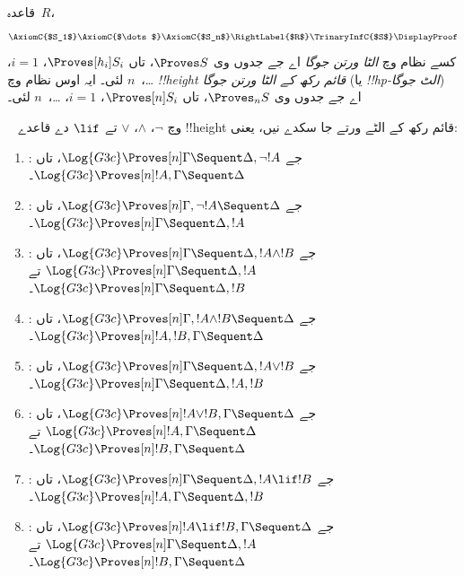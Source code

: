 \documentclass[../../../include/open-logic-section]{subfiles}
\begin{document}


\begin{defn}
قاعدہ~$R$،
\[
\AxiomC{$S_1$}
\AxiomC{$\dots$}
\AxiomC{$S_n$}
\RightLabel{$R$}
\TrinaryInfC{$S$}
\DisplayProof
\]
کسے نظام وچ \emph{الٹا ورتن جوگا} اے جے جدوں وی $\Proves S$، تاں $\Proves[h_i] S_i$، $i = 1$، \dots،~$n$ لئی۔ ایہ اوس نظام وچ \emph{!!{height} قائم رکھ کے الٹا ورتن جوگا} (یا \emph{!!{hp}-الٹ جوگا}) اے جے جدوں وی $\Proves_n S$، تاں $\Proves[n] S_i$، $i =
1$، \dots،~$n$ لئی۔
\end{defn}

\begin{lem}
~ وچ $\lnot$، $\land$، $\lor$ تے $\lif$ دے قاعدے !!{height} قائم رکھ کے الٹے ورتے جا سکدے نیں، یعنی:
\begin{enumerate}
  \item \RightR{\lnot}: جے $\Log{G3c} \Proves[n] \Gamma \Sequent
  \Delta, \lnot !A$، تاں $\Log{G3c} \Proves[n] !A, \Gamma \Sequent
  \Delta$۔
  \item \LeftR{\lnot}: جے $\Log{G3c} \Proves[n] \Gamma, \lnot !A
  \Sequent \Delta$، تاں $\Log{G3c} \Proves[n] \Gamma \Sequent \Delta,
  !A$۔
  \item \RightR{\land}: جے $\Log{G3c} \Proves[n] \Gamma \Sequent
  \Delta, !A \land !B$، تاں $\Log{G3c} \Proves[n] \Gamma \Sequent
  \Delta, !A$ تے $\Log{G3c} \Proves[n] \Gamma \Sequent
  \Delta, !B$۔
  \item \LeftR{\land}: جے $\Log{G3c} \Proves[n] \Gamma, !A \land !B
  \Sequent \Delta$، تاں $\Log{G3c} \Proves[n] !A, !B, \Gamma \Sequent
  \Delta$۔
  \item \RightR{\lor}: جے $\Log{G3c} \Proves[n] \Gamma \Sequent
  \Delta, !A \lor !B$، تاں $\Log{G3c} \Proves[n] \Gamma \Sequent
  \Delta, !A, !B$۔
  \item \LeftR{\lor}: جے $\Log{G3c} \Proves[n] !A \lor !B, \Gamma \Sequent
  \Delta$، تاں $\Log{G3c} \Proves[n] !A, \Gamma \Sequent
  \Delta$ تے $\Log{G3c} \Proves[n] !B, \Gamma \Sequent
  \Delta$۔
  \item \RightR{\lif}: جے $\Log{G3c} \Proves[n] \Gamma \Sequent
  \Delta, !A \lif !B$، تاں $\Log{G3c} \Proves[n] !A, \Gamma \Sequent
  \Delta, !B$۔
  \item \LeftR{\lif}: جے $\Log{G3c} \Proves[n] !A \lif !B, \Gamma
  \Sequent \Delta$، تاں $\Log{G3c} \Proves[n] \Gamma \Sequent \Delta,
  !A$ تے $\Log{G3c} \Proves[n] !B, \Gamma \Sequent \Delta$۔
\end{enumerate}
\end{lem}
\end{document}
